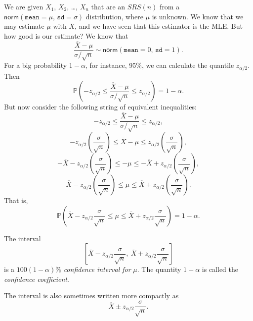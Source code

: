 We are given \(X_{1}\), \(X_{2}\), \ldots{}, \(X_{n}\) that are an
\(SRS(n)\) from a
\(\mathsf{norm}(\mathtt{mean}=\mu,\,\mathtt{sd}=\sigma)\)
distribution, where \(\mu\) is unknown. We know that we may estimate
\(\mu\) with \(\overline{X}\), and we have seen that this estimator is
the MLE. But how good is our estimate? We know that
\begin{equation} 
\frac{\overline{X}-\mu}{\sigma/\sqrt{n}}\sim\mathsf{norm}(\mathtt{mean}=0,\,\mathtt{sd}=1).
\end{equation}
For a big probability \(1-\alpha\), for instance, 95\%, we can
calculate the quantile \(z_{\alpha/2}\). Then
\begin{equation}
\mathbb{P}\left(-z_{\alpha/2}\leq\frac{\overline{X}-\mu}{\sigma/\sqrt{n}}\leq z_{\alpha/2}\right)=1-\alpha.
\end{equation}
But now consider the following string of equivalent inequalities:
\[
-z_{\alpha/2}\leq\frac{\overline{X}-\mu}{\sigma/\sqrt{n}}\leq z_{\alpha/2},
\]
\[
-z_{\alpha/2}\left(\frac{\sigma}{\sqrt{n}}\right)\leq\overline{X}-\mu\leq z_{\alpha/2}\left(\frac{\sigma}{\sqrt{n}}\right),
\]
\[
-\overline{X} - z_{\alpha/2}\left(\frac{\sigma}{\sqrt{n}}\right)\leq - \mu \leq - \overline{X} + z_{\alpha/2} \left( \frac{\sigma}{\sqrt{n}} \right),
\]
\[
\overline{X} - z_{\alpha/2} \left( \frac{\sigma}{\sqrt{n}} \right) \leq \mu \leq \overline{X} + z_{\alpha/2} \left( \frac{\sigma}{\sqrt{n}} \right).
\]
That is, 
\begin{equation}
\mathbb{P}\left(\overline{X}-z_{\alpha/2}\frac{\sigma}{\sqrt{n}}\leq\mu\leq\overline{X}+z_{\alpha/2}\frac{\sigma}{\sqrt{n}}\right)=1-\alpha.
\end{equation}

\begin{defn}
The interval
\begin{equation}
\left[\overline{X}-z_{\alpha/2}\frac{\sigma}{\sqrt{n}},\ \overline{X}+z_{\alpha/2}\frac{\sigma}{\sqrt{n}}\right]
\end{equation}
is a \(100(1-\alpha)\%\) \emph{confidence interval for} \(\mu\). The quantity \(1-\alpha\) is called the \emph{confidence coefficient}.
\end{defn}

\begin{rem}
The interval is also sometimes written more compactly as
\begin{equation}
\label{eq-z-interval}
\overline{X}\pm z_{\alpha/2}\frac{\sigma}{\sqrt{n}}.
\end{equation}
\end{rem}

